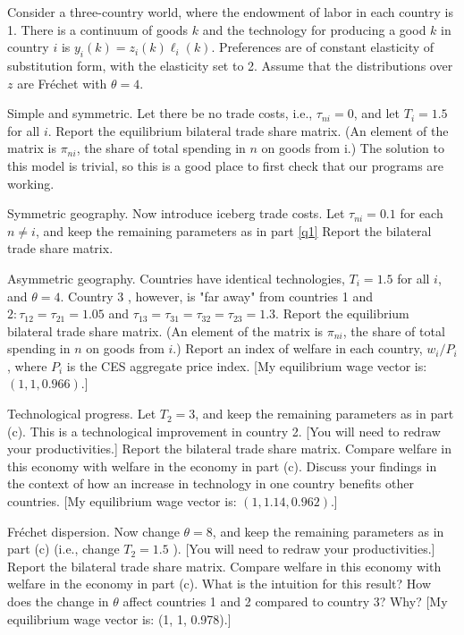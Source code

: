 \documentclass[11pt, assign]{assign}
\begin{document}
\begin{problem}[title=Simple Version of Ricardian Trade Model,source={Eaton and Kortum, 2002}]%

Consider a three-country world, where the endowment of labor in each country is 1. There is a continuum of goods $k$ and the technology for producing a good $k$ in country $i$ is $y_{i}(k)=z_{i}(k) \ell_{i}(k)$. Preferences are of constant elasticity of substitution form, with the elasticity set to 2. Assume that the distributions over $z$ are Fr\'echet with $\theta=4$.

\begin{subproblems}

\question Simple and symmetric. Let there be no trade costs, i.e., $\tau_{n i}=0$, and let $T_{i}=1.5$ for all $i$. Report the equilibrium bilateral trade share matrix. (An element of the matrix is $\pi_{n i}$, the share of total spending in $n$ on goods from i.) The solution to this model is trivial, so this is a good place to first check that our programs are working. \label{q1}

\question Symmetric geography. Now introduce iceberg trade costs. Let $\tau_{n i}=0.1$ for each $n \neq i$, and keep the remaining parameters as in part \ref{q1} Report the bilateral trade share matrix.

\question Asymmetric geography. Countries have identical technologies, $T_{i}=1.5$ for all $i$, and $\theta=4$. Country 3 , however, is "far away" from countries 1 and $2: \tau_{12}=\tau_{21}=1.05$ and $\tau_{13}=\tau_{31}=\tau_{32}=\tau_{23}=1.3$. Report the equilibrium bilateral trade share matrix. (An element of the matrix is $\pi_{n i}$, the share of total spending in $n$ on goods from $i$.) Report an index of welfare in each country, $w_{i} / P_{i}$, where $P_{i}$ is the CES aggregate price index. [My equilibrium wage vector is: $(1,1,0.966)$.]

\question Technological progress. Let $T_{2}=3$, and keep the remaining parameters as in part (c). This is a technological improvement in country 2. [You will need to redraw your productivities.] Report the bilateral trade share matrix. Compare welfare in this economy with welfare in the economy in part (c). Discuss your findings in the context of how an increase in technology in one country benefits other countries. [My equilibrium wage vector is: $(1,1.14,0.962)$.]

\question Fr\'echet dispersion. Now change $\theta=8$, and keep the remaining parameters as in part (c) (i.e., change $T_{2}=1.5$ ). [You will need to redraw your productivities.] Report the bilateral trade share matrix. Compare welfare in this economy with welfare in the economy in part (c). What is the intuition for this result? How does the change in $\theta$ affect countries 1 and 2 compared to country 3? Why? [My equilibrium wage vector is: (1, 1, 0.978).]

\end{subproblems}

\end{problem}
\end{document}
